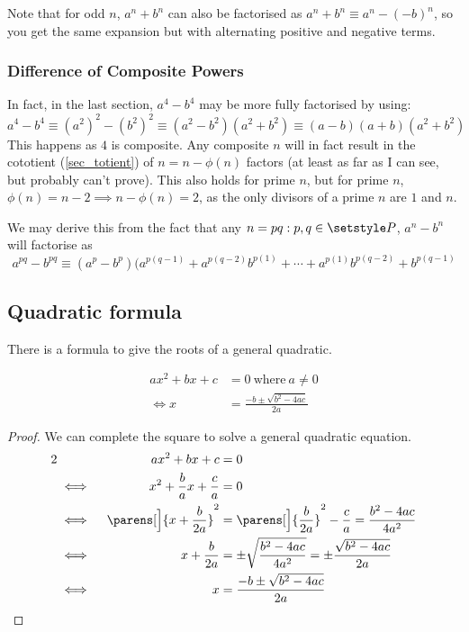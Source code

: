 Note that for odd \(n\), \(a^n + b^n\) can also be factorised as
\(a^n + b^n \equiv a^n - (-b)^n\), so you get the same expansion but with
alternating positive and negative terms.


\subsubsection{Difference of Composite Powers}

In fact, in the last section, \(a^4 - b^4\) may be more fully factorised by
using:
\begin{equation*}
 a^4 - b^4 \equiv (a^2)^2 - (b^2)^2 \equiv (a^2 - b^2)(a^2 + b^2) \equiv
     (a - b)(a + b)(a^2 + b^2)
\end{equation*}
This happens as \(4\) is composite. Any composite \(n\) will in fact result
in the cototient (\ref{sec_totient}) of \(n = n - \phi(n)\) factors (at
least as far as I can see, but probably can't prove). This
also holds for prime \(n\), but for prime \(n\),
\(\phi(n) = n - 2 \implies n - \phi(n) = 2\), as the only divisors of
a prime \(n\) are \(1\) and \(n\).

We may derive this from the fact that any \(n = pq: p, q \in \setstyle P\),
\(a^n - b^n\) will factorise as
\begin{equation}
 a^{pq} - b^{pq} \equiv
     (a^p - b^p)(a^{p(q - 1)} + a^{p(q - 2)}b^{p(1)} + \dotsb +
                 a^{p(1)}b^{p(q - 2)} + b^{p(q - 1)}
\end{equation}

\subsection{Quadratic formula} \label{sec_quad_formula}

There is a formula to give the roots of a general quadratic.
\begin{theorem}
\begin{align*}
 ax^2 + bx + c &= 0\ \text{where}\ a \neq 0 \\
 \iff x &= \frac{-b \pm \sqrt{b^2 - 4ac}}{2a}
\end{align*}
\end{theorem}
\begin{proof}
We can complete the square to solve a general quadratic equation.
\begin{alignat*}2
 &&ax^2 + bx + c &= 0 \\
 &\iff{}& x^2 + \frac ba x + \frac ca &= 0 \\
 &\iff{}& \parens[\Big]{x + \frac b{2a}}^2
     &= \parens[\Big]{\frac b{2a}}^2 - \frac ca
     = \frac{b^2 - 4ac}{4a^2} \\
 &\iff{}& x + \frac b{2a} &= \pm \sqrt{\frac{b^2 - 4ac}{4a^2}}
     = \pm \frac{\sqrt{b^2 - 4ac}}{2a} \\
 &\iff{}& x &= \frac{-b \pm \sqrt{b^2 - 4ac}}{2a} \qedhere
\end{alignat*}
\end{proof}


